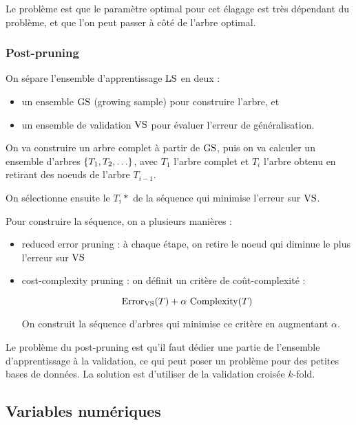 		Le problème est que le paramètre optimal pour cet élagage est très dépendant du problème, et que l'on peut passer à côté de l'arbre optimal.
		
		
		\subsubsection{Post-pruning}
		
		On sépare l'ensemble d'apprentissage $\text{LS}$ en deux :
		
		\begin{itemize}
			\item un ensemble $\text{GS}$ (growing sample) pour construire l'arbre, et
			\item un ensemble de validation $\text{VS}$ pour évaluer l'erreur de généralisation.
		\end{itemize}
		
		On va construire un arbre complet à partir de $\text{GS}$, puis on va calculer un ensemble d'arbres $\ens{T_1, T_2, \dots}$, avec $T_1$ l'arbre complet et $T_i$ l'arbre obtenu en retirant des noeuds de l'arbre $T_{i - 1}$.
		
		On sélectionne ensuite le $T_i*$ de la séquence qui minimise l'erreur sur $\text{VS}$.
		
		
		Pour construire la séquence, on a plusieurs manières :
		
		\begin{itemize}
			\item reduced error pruning : à chaque étape, on retire le noeud qui diminue le plus l'erreur sur $\text{VS}$
			\item cost-complexity pruning : on définit un critère de coût-complexité :
			
			$$\text{Error}_{\text{VS}}(T) + \alpha \text{ Complexity}(T)$$
			
			On construit la séquence d'arbres qui minimise ce critère en augmentant $\alpha$.
		\end{itemize}
		
		
		Le problème du post-pruning est qu'il faut dédier une partie de l'ensemble d'apprentissage à la validation, ce qui peut poser un problème pour des petites bases de données. La solution est d'utiliser de la validation croisée $k$-fold.
	
	\subsection{Variables numériques}
	
